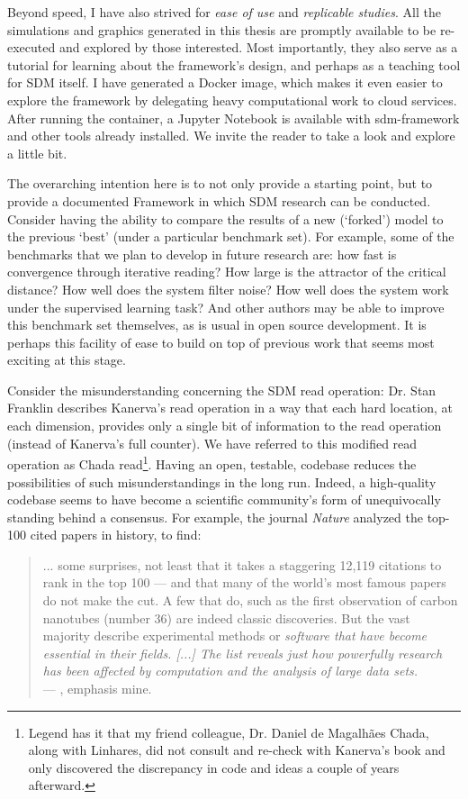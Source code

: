 Beyond speed, I have also strived for \emph{ease of use} and \emph{replicable studies}.  All the simulations and graphics generated in this thesis are promptly available to be re-executed and explored by those interested. Most importantly, they also serve as a tutorial for learning about the framework's design, and perhaps as a teaching tool for SDM itself. I have generated a Docker image, which makes it even easier to explore the framework by delegating heavy computational work to cloud services. After running the container, a Jupyter Notebook is available with sdm-framework and other tools already installed. We invite the reader to take a look and explore a little bit.

The overarching intention here is to not only provide a starting point, but to provide a documented Framework in which SDM research can be conducted.  Consider having the ability to compare the results of a new (‘forked’) model to the previous `best' (under a particular benchmark set).  For example, some of the benchmarks that we plan to develop in future research are: how fast is convergence through iterative reading?  How large is the attractor of the critical distance?  How well does the system filter noise?  How well does the system work under the supervised learning task?  And other authors may be able to improve this benchmark set themselves, as is usual in open source development.  It is perhaps this facility of ease to build on top of previous work that seems most exciting at this stage.

Consider the misunderstanding concerning the SDM read operation:  Dr. Stan Franklin describes Kanerva's read operation in a way that each hard location, at each dimension, provides only a single bit of information to the read operation (instead of Kanerva's full counter).  We have referred to this modified read operation as Chada read\footnote{Legend has it that my friend \text{\&} colleague, Dr. Daniel de Magalhães Chada, along with Linhares, did not consult and re-check with Kanerva's book and only discovered the discrepancy in code and ideas a couple of years afterward.}.  Having an open, testable, codebase reduces the possibilities of such misunderstandings in the long run.  Indeed, a high-quality codebase seems to have become a scientific community's form of unequivocally standing behind a consensus. For example, the journal \emph{Nature} analyzed the top-100 cited papers in history, to find:

\begin{quote}
... some surprises, not least that it takes a staggering 12,119 citations to rank in the top 100 — and that many of the world’s most famous papers do not make the cut. A few that do, such as the first observation of carbon nanotubes (number 36) are indeed classic discoveries. But the vast majority describe experimental methods or \emph{software that have become essential in their fields. [...] The list reveals just how powerfully research has been affected by computation and the analysis of large data sets.} \\
\hfill --- \citet{van2014top}, emphasis mine.
\end{quote}

